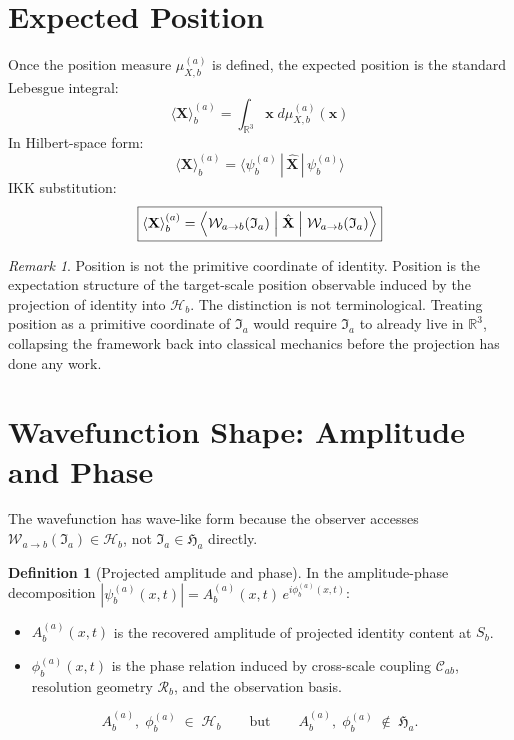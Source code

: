 \documentclass[12pt, a4paper]{article}
\theoremstyle{definition}
\newtheorem{defn}{Definition}[section]
\theoremstyle{plain}
\theoremstyle{remark}
\newtheorem{remark}{Remark}[section]
\newcommand{\Ia}{\mathfrak{I}_a}
\newcommand{\Ha}{\mathfrak{H}_a}        %
\newcommand{\Hb}{\mathcal{H}_b}         %
\newcommand{\Sb}{S_b}
\newcommand{\Wab}{\mathcal{W}_{a\to b}}   %
\newcommand{\Cab}{\mathcal{C}_{ab}}        %
\newcommand{\Rb}{\mathcal{R}_b}            %
\newcommand{\Aab}{A_b^{(a)}}
\newcommand{\phiab}{\phi_b^{(a)}}
\newcommand{\Xhat}{\hat{\mathbf{X}}}
\newcommand{\muX}{\mu_{X,b}^{(a)}}
\newcommand{\Xexp}{\langle\mathbf{X}\rangle_b^{(a)}}
\begin{document}
\section{Expected Position}
\label{sec:exppos}

Once the position measure $\muX$ is defined, the expected position
is the standard Lebesgue integral:
\[
  \boxed{
    \Xexp = \int_{\mathbb{R}^3} \mathbf{x}\;d\muX(\mathbf{x})
  }
\]
In Hilbert-space form:
\[
  \boxed{
    \Xexp = \langle\psi_b^{(a)}\,|\,\Xhat\,|\,\psi_b^{(a)}\rangle
  }
\]
IKK substitution:
\[
  \boxed{
    \Xexp
    = \Bigl\langle \Wab(\Ia) \;\Big|\; \Xhat \;\Big|\; \Wab(\Ia) \Bigr\rangle
  }
\]

\begin{remark}
Position is not the primitive coordinate of identity.
Position is the expectation structure of the target-scale position
observable induced by the projection of identity into $\Hb$.
The distinction is not terminological.
Treating position as a primitive coordinate of $\Ia$ would require
$\Ia$ to already live in $\mathbb{R}^3$, collapsing the framework
back into classical mechanics before the projection has done
any work.
\end{remark}


\section{Wavefunction Shape: Amplitude and Phase}
\label{sec:waveshape}

The wavefunction has wave-like form because the observer accesses
$\Wab(\Ia) \in \Hb$, not $\Ia \in \Ha$ directly.

\begin{defn}[Projected amplitude and phase]
\label{def:ampphase}
In the amplitude-phase decomposition
$|\psi_b^{(a)}(x,t)| = \Aab(x,t)\,e^{i\phiab(x,t)}$:
\begin{itemize}
  \item $\Aab(x,t)$ is the recovered amplitude of projected identity
    content at $\Sb$.
  \item $\phiab(x,t)$ is the phase relation induced by cross-scale
    coupling $\Cab$, resolution geometry $\Rb$, and the observation
    basis.
\end{itemize}
\[
  \Aab,\;\phiab \;\in\; \Hb
  \qquad\text{but}\qquad
  \Aab,\;\phiab \;\notin\; \Ha.
\]
\end{defn}
\end{document}
